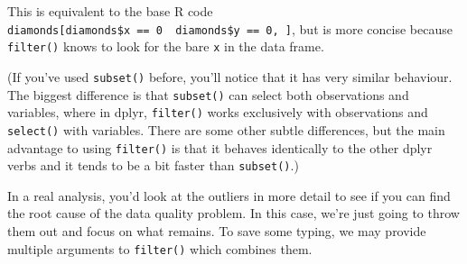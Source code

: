 \begin{Shaded}
\begin{Highlighting}[]
\StringTok{ } \NormalTok{|}\StringTok{ }\StringTok{ }\NormalTok{)}
\CommentTok{#> }
\end{Highlighting}
\end{Shaded}

This is equivalent to the base R code
\texttt{diamonds{[}diamonds\$x\ ==\ 0\ \textbar{}\ diamonds\$y\ ==\ 0,\ {]}},
but is more concise because \texttt{filter()} knows to look for the bare
\texttt{x} in the data frame.

(If you've used \texttt{subset()} before, you'll notice that it has very
similar behaviour. The biggest difference is that \texttt{subset()} can
select both observations and variables, where in dplyr,
\texttt{filter()} works exclusively with observations and
\texttt{select()} with variables. There are some other subtle
differences, but the main advantage to using \texttt{filter()} is that
it behaves identically to the other dplyr verbs and it tends to be a bit
faster than \texttt{subset()}.)

In a real analysis, you'd look at the outliers in more detail to see if
you can find the root cause of the data quality problem. In this case,
we're just going to throw them out and focus on what remains. To save
some typing, we may provide multiple arguments to \texttt{filter()}
which combines them.

